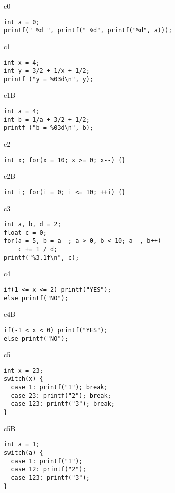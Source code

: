 
\begin{chunk}{c0}
\begin{verbatim}
int a = 0; 
printf(" %d ", printf(" %d", printf("%d", a)));
\end{verbatim}
\end{chunk}

\begin{chunk}{c1}
\begin{verbatim}
int x = 4;
int y = 3/2 + 1/x + 1/2;
printf ("y = %03d\n", y);
\end{verbatim}
\end{chunk}

\begin{chunk}{c1B}
\begin{verbatim}
int a = 4;
int b = 1/a + 3/2 + 1/2;
printf ("b = %03d\n", b);
\end{verbatim}
\end{chunk}

\begin{chunk}{c2}
\begin{verbatim}
int x; for(x = 10; x >= 0; x--) {} 
\end{verbatim}
\end{chunk}

\begin{chunk}{c2B}
\begin{verbatim}
int i; for(i = 0; i <= 10; ++i) {} 
\end{verbatim}
\end{chunk}

\begin{chunk}{c3}
\begin{verbatim}
int a, b, d = 2;
float c = 0;
for(a = 5, b = a--; a > 0, b < 10; a--, b++)
    c += 1 / d;
printf("%3.1f\n", c);
\end{verbatim}
\end{chunk}

\begin{chunk}{c4}
\begin{verbatim}
if(1 <= x <= 2) printf("YES");
else printf("NO");
\end{verbatim}
\end{chunk}

\begin{chunk}{c4B}
\begin{verbatim}
if(-1 < x < 0) printf("YES");
else printf("NO");
\end{verbatim}
\end{chunk}


\begin{chunk}{c5}
\begin{verbatim}
int x = 23;
switch(x) {
  case 1: printf("1"); break;
  case 23: printf("2"); break;
  case 123: printf("3"); break;
}
\end{verbatim}
\end{chunk}

\begin{chunk}{c5B}
\begin{verbatim}
int a = 1;
switch(a) {
  case 1: printf("1");
  case 12: printf("2");
  case 123: printf("3");
}
\end{verbatim}
\end{chunk}

